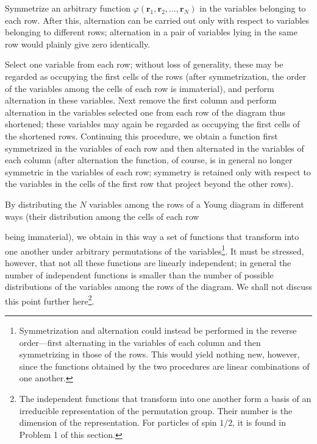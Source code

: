 \begin{figure}[ht]
\centering
{}
\par{}
\end{figure}

Symmetrize an arbitrary function $\varphi(\mathbf r_1,\mathbf r_2,\ldots,\mathbf r_N)$ in the variables belonging to each row. After this, alternation can be carried out only with respect to variables belonging to different rows; alternation in a pair of variables lying in the same row would plainly give zero identically.

Select one variable from each row; without loss of generality, these may be regarded as occupying the first cells of the rows (after symmetrization, the order of the variables among the cells of each row is immaterial), and perform alternation in these variables. Next remove the first column and perform alternation in the variables selected one from each row of the diagram thus shortened; these variables may again be regarded as occupying the first cells of the shortened rows. Continuing this procedure, we obtain a function first symmetrized in the variables of each row and then alternated in the variables of each column (after alternation the function, of course, is in general no longer symmetric in the variables of each row; symmetry is retained only with respect to the variables in the cells of the first row that project beyond the other rows).

By distributing the $N$ variables among the rows of a Young diagram in different ways (their distribution among the cells of each row

being immaterial), we obtain in this way a set of functions that transform into one another under arbitrary permutations of the variables\footnote{Symmetrization and alternation could instead be performed in the reverse order---first alternating in the variables of each column and then symmetrizing in those of the rows. This would yield nothing new, however, since the functions obtained by the two procedures are linear combinations of one another.}. It must be stressed, however, that not all these functions are linearly independent; in general the number of independent functions is smaller than the number of possible distributions of the variables among the rows of the diagram. We shall not discuss this point further here\footnote{The independent functions that transform into one another form a basis of an irreducible representation of the permutation group. Their number is the dimension of the representation. For particles of spin $1/2$, it is found in Problem 1 of this section.}.

